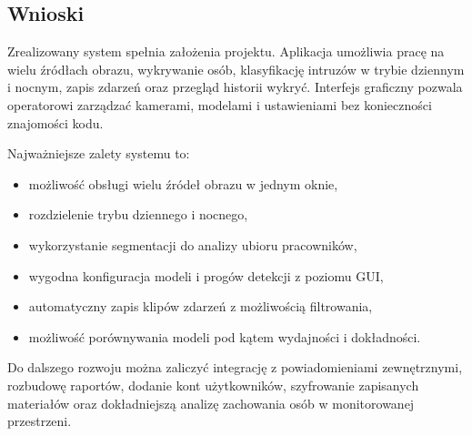\subsection{Wnioski}

Zrealizowany system spełnia założenia projektu. Aplikacja umożliwia pracę na wielu źródłach obrazu, wykrywanie osób, klasyfikację intruzów w trybie dziennym i nocnym, zapis zdarzeń oraz przegląd historii wykryć. Interfejs graficzny pozwala operatorowi zarządzać kamerami, modelami i ustawieniami bez konieczności znajomości kodu.

Najważniejsze zalety systemu to:

\begin{itemize}
\item możliwość obsługi wielu źródeł obrazu w jednym oknie,
\item rozdzielenie trybu dziennego i nocnego,
\item wykorzystanie segmentacji do analizy ubioru pracowników,
\item wygodna konfiguracja modeli i progów detekcji z poziomu GUI,
\item automatyczny zapis klipów zdarzeń z możliwością filtrowania,
\item możliwość porównywania modeli pod kątem wydajności i dokładności.
\end{itemize}

Do dalszego rozwoju można zaliczyć integrację z powiadomieniami zewnętrznymi, rozbudowę raportów, dodanie kont użytkowników, szyfrowanie zapisanych materiałów oraz dokładniejszą analizę zachowania osób w monitorowanej przestrzeni.
